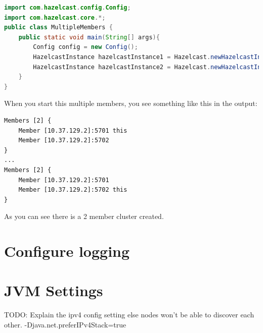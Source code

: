 \begin{lstlisting}[language=java]
import com.hazelcast.config.Config;
import com.hazelcast.core.*;
public class MultipleMembers {
    public static void main(String[] args){
        Config config = new Config();
        HazelcastInstance hazelcastInstance1 = Hazelcast.newHazelcastInstance(config);
        HazelcastInstance hazelcastInstance2 = Hazelcast.newHazelcastInstance(config);
    }
}
\end{lstlisting}
When you start this multiple members, you see something like this in the output:
\begin{verbatim}
Members [2] {
    Member [10.37.129.2]:5701 this
    Member [10.37.129.2]:5702
}
...
Members [2] {
    Member [10.37.129.2]:5701
    Member [10.37.129.2]:5702 this
}
\end{verbatim}
As you can see there is a 2 member cluster created.

\section{Configure logging}

\section{JVM Settings}
TODO: Explain the ipv4 config setting else nodes won't be able to discover each other.
-Djava.net.preferIPv4Stack=true
